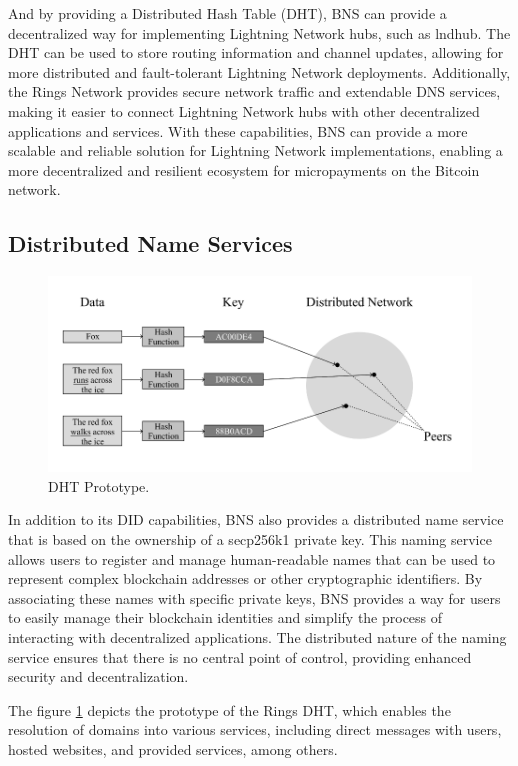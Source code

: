 \documentclass[twocolumn]{article}
\begin{document}
And by providing a Distributed Hash Table (DHT), BNS can provide a decentralized way for implementing Lightning Network hubs, such as lndhub. The DHT can be used to store routing information and channel updates, allowing for more distributed and fault-tolerant Lightning Network deployments. Additionally, the Rings Network provides secure network traffic and extendable DNS services, making it easier to connect Lightning Network hubs with other decentralized applications and services. With these capabilities, BNS can provide a more scalable and reliable solution for Lightning Network implementations, enabling a more decentralized and resilient ecosystem for micropayments on the Bitcoin network.

\subsection{Distributed Name Services}
\begin{figure}[H]
  \label{dht}
  \includegraphics[width=\linewidth]{imgs/1.png}
  \caption{DHT Prototype.}
\end{figure}

In addition to its DID capabilities, BNS also provides a distributed name service that is based on the ownership of a secp256k1 private key. This naming service allows users to register and manage human-readable names that can be used to represent complex blockchain addresses or other cryptographic identifiers. By associating these names with specific private keys, BNS provides a way for users to easily manage their blockchain identities and simplify the process of interacting with decentralized applications. The distributed nature of the naming service ensures that there is no central point of control, providing enhanced security and decentralization.

The figure \ref{dht} depicts the prototype of the Rings DHT, which enables the resolution of domains into various services, including direct messages with users, hosted websites, and provided services, among others.
\end{document}
